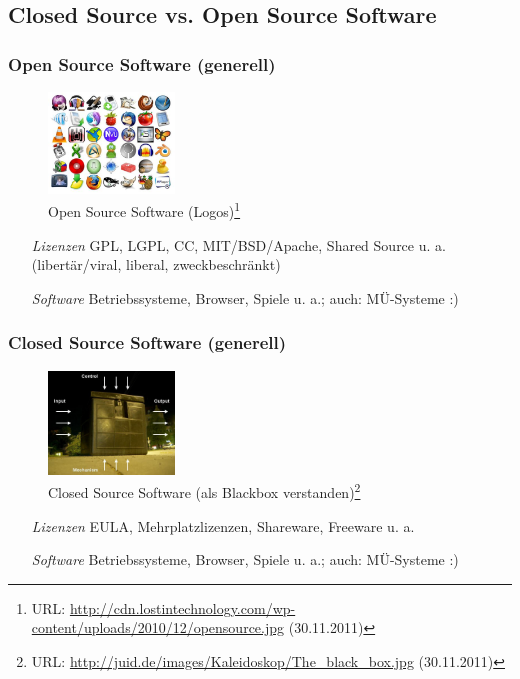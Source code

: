 \documentclass{beamer}
\begin{document}
\subsection{Closed Source vs. Open Source Software}
\begin{frame}
\frametitle{Open Source Software (generell)}
\begin{figure}
  \includegraphics[width=0.30\textwidth]{graphics/ossmatrix}
  \caption{Open Source Software (Logos)\footnote{URL: \url{http://cdn.lostintechnology.com/wp-content/uploads/2010/12/opensource.jpg} (30.11.2011)}}
  \end{figure}
\begin{itemize}
\item[\emph{Lizenzen}] GPL, LGPL, CC, MIT/BSD/Apache, Shared Source u. a. (libertär/viral, liberal, zweckbeschränkt)
\item[\emph{Software}] Betriebssysteme, Browser, Spiele u. a.; auch: MÜ-Systeme :)
\end{itemize}
\end{frame}
\begin{frame}
\frametitle{Closed Source Software (generell)}
\begin{figure}
  \includegraphics[width=0.30\textwidth]{graphics/cssblackbox}
  \caption{Closed Source Software (als Blackbox verstanden)\footnote{URL: \url{http://juid.de/images/Kaleidoskop/The_black_box.jpg} (30.11.2011)}}
  \end{figure}
\begin{itemize}
\item[\emph{Lizenzen}] EULA, Mehrplatzlizenzen, Shareware, Freeware u. a.
\item[\emph{Software}] Betriebssysteme, Browser, Spiele u. a.; auch: MÜ-Systeme :)
\end{itemize}
\end{frame}
\end{document}
